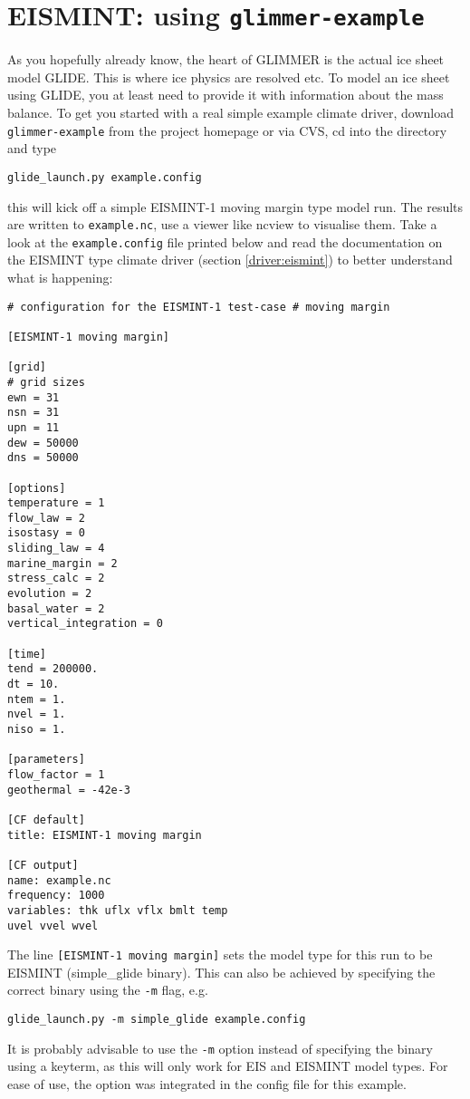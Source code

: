 
\section{EISMINT: using \texttt{glimmer-example}}
As you hopefully already know, the heart of GLIMMER is the actual ice sheet model
GLIDE. This is where ice physics are resolved etc. To model an ice sheet using
GLIDE, you at least need to provide it with information about the 
mass balance. To get you started with a real simple example climate driver,
download \texttt{glimmer-example} from the project homepage or via CVS, cd into
the directory and type
\begin{verbatim}
glide_launch.py example.config
\end{verbatim}
this will kick off a simple EISMINT-1 moving margin type model run. The results
are written to \texttt{example.nc}, use a viewer like ncview to visualise them.
Take a look at the \texttt{example.config} file printed below and read the documentation on
the EISMINT type climate driver (section \ref{driver:eismint}) to better understand what is happening:\\

\begin{verbatim}
# configuration for the EISMINT-1 test-case # moving margin

[EISMINT-1 moving margin]

[grid]
# grid sizes
ewn = 31
nsn = 31
upn = 11
dew = 50000
dns = 50000

[options]
temperature = 1
flow_law = 2
isostasy = 0
sliding_law = 4
marine_margin = 2
stress_calc = 2
evolution = 2
basal_water = 2
vertical_integration = 0

[time]
tend = 200000.
dt = 10.
ntem = 1.
nvel = 1.
niso = 1.

[parameters]
flow_factor = 1
geothermal = -42e-3

[CF default]
title: EISMINT-1 moving margin

[CF output]
name: example.nc
frequency: 1000
variables: thk uflx vflx bmlt temp
uvel vvel wvel
\end{verbatim}

The line \texttt{[EISMINT-1 moving margin]} sets the model type for this run to be EISMINT (simple\_glide binary).
This can also be achieved by specifying the correct binary using the \texttt{-m} flag, e.g.
\begin{verbatim}
glide_launch.py -m simple_glide example.config
\end{verbatim}
It is probably advisable to use the \texttt{-m} option instead of specifying the binary using a 
keyterm, as this will only work for EIS and EISMINT model types. For ease of use, the option was integrated
in the config file for this example. 

